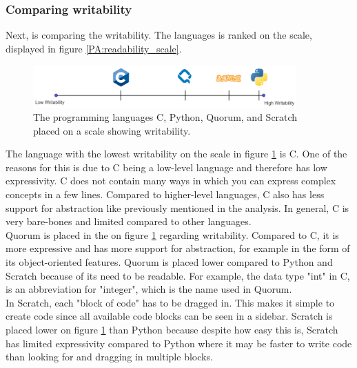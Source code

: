 \subsubsection{Comparing writability}
Next, is comparing the writability. The languages is ranked on the scale,  displayed in figure \ref{PA:readability_scale}. 

\begin{figure}[H] 
    \begin{center}
        \includegraphics[width=0.9\textwidth]{Files/Billeder: Analyse/Writability.png}
    \end{center}
    \caption{The programming languages C, Python, Quorum, and Scratch placed on a scale showing writability.}
    \label{PA:writability_scale}
\end{figure}

The language with the lowest writability on the scale in figure \ref{PA:writability_scale} is C. One of the reasons for this is due to C being a low-level language and therefore has low expressivity. C does not contain many ways in which you can express complex concepts in a few lines. Compared to higher-level languages, C also has less support for abstraction like previously mentioned in the analysis. In general, C is very bare-bones and limited compared to other languages.\\

Quorum is placed in the on figure \ref{PA:writability_scale} regarding writability. Compared to C, it is more expressive and has more support for abstraction, for example in the form of its object-oriented features. Quorum is placed lower compared to Python and Scratch because of its need to be readable. For example, the data type "int" in C, is an abbreviation for "integer", which is the name used in Quorum.\\

In Scratch, each "block of code" has to be dragged in. This makes it simple to create code since all available code blocks can be seen in a sidebar. Scratch is placed lower on figure \ref{PA:writability_scale} than Python because despite how easy this is, Scratch has limited expressivity compared to Python where it may be faster to write code than looking for and dragging in multiple blocks.\\

